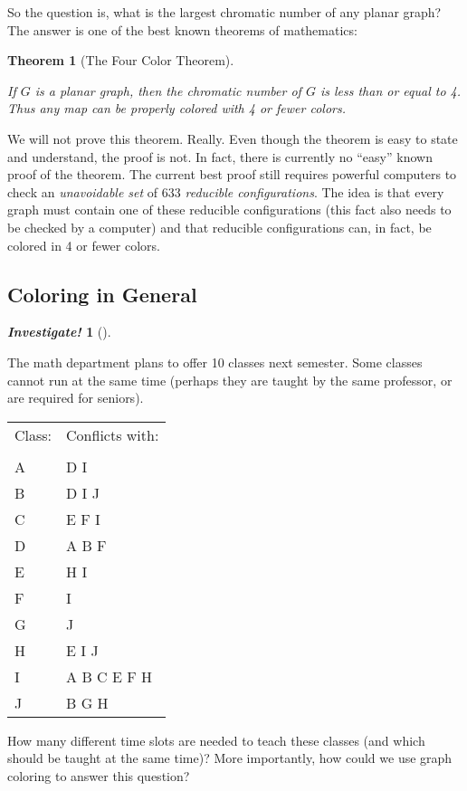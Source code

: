 \documentclass[10pt,]{book}
\theoremstyle{plain}
\newtheorem{theorem}{Theorem}[section]
\theoremstyle{definition}
\theoremstyle{definition}
\newtheorem{investigation}[project]{\emph{Investigate!}}
\theoremstyle{definition}
\numberwithin{equation}{chapter}
\newcommand{\hrulethin}  {\noalign{\hrule height 0.04em}}
\begin{document}
So the question is, what is the largest chromatic number of any planar graph? The answer is one of the best known theorems of mathematics:
%
\begin{theorem}[The Four Color Theorem]\label{theorem-5}

If \(G\) is a planar graph, then the chromatic number of \(G\) is less than or equal to 4. Thus any map can be properly colored with 4 or fewer colors.
%
\end{theorem}
\par

We will not prove this theorem. Really. Even though the theorem is easy to state and understand, the proof is not. In fact, there is currently no ``easy'' known proof of the theorem. The current best proof still requires powerful computers to check an \emph{unavoidable set} of 633 \emph{reducible configurations}. The idea is that every graph must contain one of these reducible configurations (this fact also needs to be checked by a computer) and that reducible configurations can, in fact, be colored in 4 or fewer colors.
%
\typeout{************************************************}
\typeout{************************************************}
\subsection[Coloring in General]{Coloring in General}\label{subsection-39}
\begin{investigation}[]\label{investigation-34}

The math department plans to offer 10 classes next semester. Some classes cannot run at the same time (perhaps they are taught by the same professor, or are required for seniors).
%
\begin{tabular}{ll}
Class:&Conflicts with:\tabularnewline[0pt]
&\tabularnewline\hrulethin
A&D I\tabularnewline[0pt]
B&D I J\tabularnewline[0pt]
C&E F I\tabularnewline[0pt]
D&A B F\tabularnewline[0pt]
E&H I\tabularnewline[0pt]
F&I\tabularnewline[0pt]
G&J\tabularnewline[0pt]
H&E I J\tabularnewline[0pt]
I&A B C E F H\tabularnewline[0pt]
J&B G H
\end{tabular}
\par

How many different time slots are needed to teach these classes (and which should be taught at the same time)? More importantly, how could we use graph coloring to answer this question?
%
\end{investigation}
\end{document}
